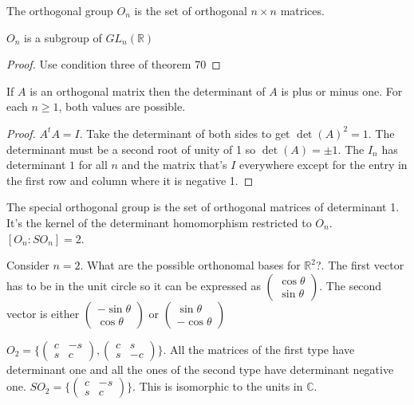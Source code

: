 \documentclass{article}
\newcommand{\C}{\mathbb{C}}
\newcommand{\R}{\mathbb{R}}
\begin{document}
\begin{definition}
The orthogonal group $O_n$ is the set of orthogonal $n\times n$ matrices.
\end{definition}
\begin{proposition}
$O_n$ is a subgroup of $GL_n(\R)$
\end{proposition}
\begin{proof}
Use condition three of theorem 70
\end{proof}
\begin{proposition}
If $A$ is an orthogonal matrix then the determinant of $A$ is plus or minus one. For each $n\geq 1$, both values are possible. 
\end{proposition}
\begin{proof}
$A^tA=I$. Take the determinant of both sides to get $\det(A)^2=1$. The determinant must be a second root of unity of 1 so $\det(A)=\pm 1$. The $I_n$ has determinant $1$ for all $n$ and the matrix that's $I$ everywhere except for the entry in the first row and column where it is negative 1.
\end{proof}
\begin{definition}
The special orthogonal group is the set of orthogonal matrices of determinant 1. It's the kernel of the determinant homomorphism restricted to $O_n$. $[O_n:SO_n]=2$. 
\end{definition}
\begin{example}
Consider $n=2$. What are the possible orthonomal bases for $\R^2$?. The first vector has to be in the unit circle so it can be expressed as $\begin{pmatrix}
\cos\theta\\\sin\theta
\end{pmatrix}$. The second vector is either $\begin{pmatrix}
-\sin\theta\\\cos\theta
\end{pmatrix}$ or $\begin{pmatrix}
\sin\theta\\-\cos\theta
\end{pmatrix}$
\end{example}
\begin{corollary}
$O_2=\{\begin{pmatrix}
c&-s\\s&c
\end{pmatrix},\begin{pmatrix}
c&s\\s&-c
\end{pmatrix}\}$. All the matrices of the first type have determinant one and all the ones of the second type have determinant negative one. $SO_2=\{\begin{pmatrix}
c&-s\\s&c
\end{pmatrix}\}$. This is isomorphic to the units in $\C$.
\end{corollary}
\end{document}
